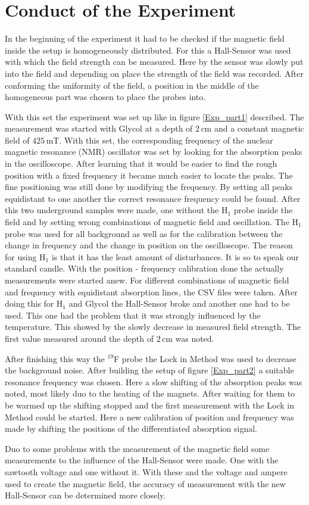 \section{Conduct of the Experiment}
In the beginning of the experiment it had to be checked if the magnetic field inside the setup is homogeneously distributed. For this a Hall-Sensor was used with which the field strength can be measured. Here by the sensor was slowly put into the field and depending on place the strength of the field was recorded. After conforming the uniformity of the field, a position in the middle of the homogeneous part was chosen to place the probes into.\par
With this set the experiment was set up like in figure \ref{Exp_part1} described. The measurement was started with Glycol at a depth of $2$\,cm and a constant magnetic field of $425\,$mT. With this set, the corresponding frequency of the nuclear magnetic resonance (NMR) oscillator was set by looking for the absorption peaks in the oscilloscope. After learning that it would be easier to find the rough position with a fixed frequency it became much easier to locate the peaks. The fine positioning was still done by modifying the frequency. By setting all peaks equidistant to one another the correct resonance frequency could be found. After this two underground samples were made, one without the H$_1$ probe inside the field and by setting wrong combinations of magnetic field and oscillation. The H$_1$ probe was used for all background as well as for the calibration between the change in frequency and the change in position on the oscilloscope. The reason for using H$_1$ is that it has the least amount of disturbances. It is so to speak our standard candle. With the position - frequency calibration done the actually measurements were started anew. For different combinations of magnetic field and frequency with equidistant absorption lines, the CSV files were taken. After doing this for H$_1$ and Glycol the Hall-Sensor broke and another one had to be used. This one had the problem that it was strongly influenced by the temperature. This showed by the slowly decrease in measured field strength. The first value measured around the depth of $2\,$cm was noted.\par 
After finishing this way the $^{19}$F probe the Lock in Method was used to decrease the background noise. After building the setup of figure \ref{Exp_part2} a suitable resonance frequency was chosen. Here a slow shifting of the absorption peaks was noted, most likely duo to the heating of the magnets. After waiting for them to be warmed up the shifting stopped and the first measurement with the Lock in Method could be started. Here a new calibration of position and frequency was made by shifting the positions of the differentiated absorption signal.\par
Duo to some problems with the measurement of the magnetic field some measurements to the influence of the Hall-Sensor were made. One with the sawtooth voltage and one without it. With these and the voltage and ampere used to create the magnetic field, the accuracy of measurement with the new Hall-Sensor can be determined more closely.